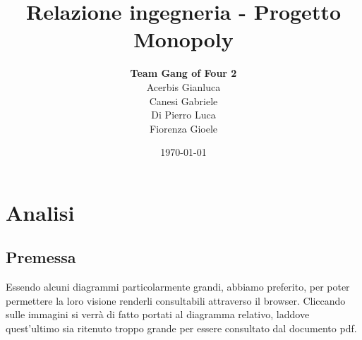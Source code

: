 \documentclass{article}
\title{ \textbf{Relazione ingegneria - Progetto Monopoly}}
\author {\textbf{Team Gang of Four 2}\\Acerbis Gianluca\\Canesi Gabriele\\Di Pierro Luca\\Fiorenza Gioele}
\date{\today}
\begin{document}
\maketitle

\section{Analisi}

\subsection{Premessa}
Essendo alcuni diagrammi particolarmente grandi, abbiamo preferito, per poter permettere la loro visione  renderli consultabili attraverso il browser.
Cliccando sulle immagini si verrà di fatto portati al diagramma relativo, laddove quest'ultimo sia ritenuto troppo grande per essere consultato dal documento pdf.
\end{document}
